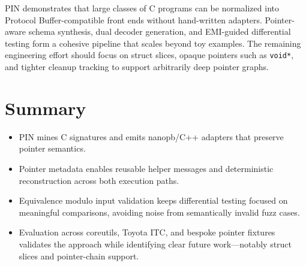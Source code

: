 \documentclass[doublespace,nopageskip]{VTthesis} %
\begin{document}
PIN demonstrates that large classes of C programs can be normalized into Protocol Buffer-compatible front ends without hand-written adapters. Pointer-aware schema synthesis, dual decoder generation, and EMI-guided differential testing form a cohesive pipeline that scales beyond toy examples. The remaining engineering effort should focus on struct slices, opaque pointers such as \texttt{void*}, and tighter cleanup tracking to support arbitrarily deep pointer graphs.

\chapter{Summary} \label{ch:summary}

\begin{itemize}
    \item PIN mines C signatures and emits nanopb/C++ adapters that preserve pointer semantics.
    \item Pointer metadata enables reusable helper messages and deterministic reconstruction across both execution paths.
    \item Equivalence modulo input validation keeps differential testing focused on meaningful comparisons, avoiding noise from semantically invalid fuzz cases.
    \item Evaluation across coreutils, Toyota ITC, and bespoke pointer fixtures validates the approach while identifying clear future work---notably struct slices and pointer-chain support.
\end{itemize}

	
   

	\appendix
\end{document}
